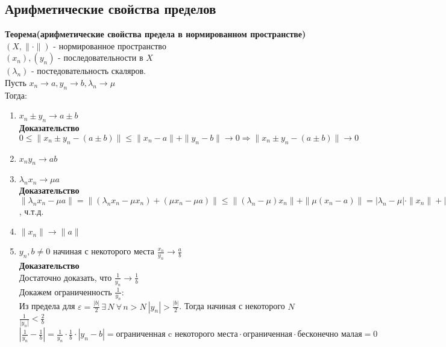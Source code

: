 \documentclass[12pt]{article}
\begin{document}
\subsection{Арифметические свойства пределов}
\textbf{Теорема(арифметические свойства предела в нормированном пространстве)}\\
$(X,\|\cdot\|)$ - нормированное пространство\\
$(x_n),(y_n)$ - последовательности в $X$\\
$(\lambda_n)$ - постедовательность скаляров.\\
Пусть $x_n\rightarrow a, y_n\rightarrow b, \lambda_n \rightarrow \mu$\\
Тогда:
\begin{enumerate}
    \item $x_n\pm y_n \rightarrow a\pm b$\\
    \textbf{Доказательство}\\
    $0 \leq \|x_n\pm y_n - (a\pm b)\| \leq \|x_n-a\|+\|y_n-b\| \rightarrow 0 \Rightarrow \|x_n\pm y_n - (a\pm b)\| \rightarrow 0$
    \item $x_ny_n \rightarrow ab$
    \item $\lambda_n x_n \rightarrow \mu a$\\
    \textbf{Доказательство}\\
    $\|\lambda_n x_n - \mu a\| = \|(\lambda_nx_n-\mu x_n) + (\mu x_n - \mu a)\| \leq \|(\lambda_n-\mu)x_n\| + \|\mu(x_n-a)\| = |\lambda_n-\mu|\cdot\|x_n\|+|\mu|\cdot\|x_n-a\| = |\text{б.м.}|\cdot\|\text{огр.}\|+|\text{огр.}|\cdot\|\text{б.м.}\| = \text{б.м.}$, ч.т.д.
    \item $\|x_n\| \rightarrow \|a\|$
    \item $y_n,b\neq 0$ начиная с некоторого места $\frac{x_n}{y_n} \rightarrow \frac{a}{b}$\\
    \textbf{Доказательство}\\
    Достаточно доказать, что $\frac 1{y_n} \rightarrow \frac 1b$\\
    Докажем ограниченность $\frac 1{y_n}$:\\
    Из предела для $\varepsilon=\frac{|b|}2\, \exists\,N\ \forall\,n>N\ |y_n|>\frac{|b|}2$. Тогда начиная с некоторого $N$ $\frac1{|y_n|} < \frac{2}{b}$\\
    $|\frac 1{y_n} - \frac 1b | = \frac 1{y_n}\cdot\frac1b\cdot|y_n-b| = \text{ограниченная c некоторого места}\cdot\text{ограниченная}\cdot\text{бесконечно малая} = 0$
\end{enumerate}
\end{document}
